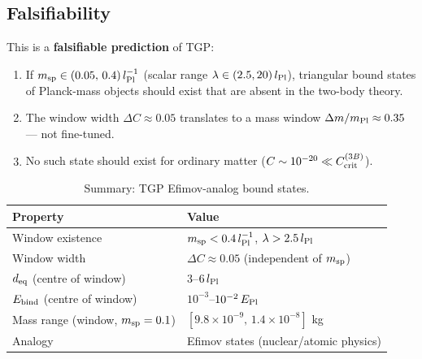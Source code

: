 \subsection{Falsifiability}

This is a \textbf{falsifiable prediction} of TGP:

\begin{enumerate}
\item If $m_{\rm sp}\in(0.05,\,0.4)\,l_{\rm Pl}^{-1}$ (scalar range
  $\lambda\in(2.5,20)\,l_{\rm Pl}$), triangular bound states of
  Planck-mass objects should exist that are absent in the two-body theory.
\item The window width $\Delta C\approx0.05$ translates to a mass window
  $\Delta m/m_{\rm Pl}\approx0.35$ — not fine-tuned.
\item No such state should exist for ordinary matter
  ($C\sim10^{-20}\ll C_{\rm crit}^{(3B)}$).
\end{enumerate}

\begin{table}[h]
\centering
\caption{Summary: TGP Efimov-analog bound states.}
\label{tab:efimov_summary}
\begin{tabular}{ll}
\hline
Property & Value \\
\hline
Window existence & $m_{\rm sp} < 0.4\,l_{\rm Pl}^{-1}$, $\lambda > 2.5\,l_{\rm Pl}$ \\
Window width & $\Delta C \approx 0.05$ (independent of $m_{\rm sp}$) \\
$d_{\rm eq}$ (centre of window) & $3$--$6\,l_{\rm Pl}$ \\
$E_{\rm bind}$ (centre of window) & $10^{-3}$--$10^{-2}\,E_{\rm Pl}$ \\
Mass range (window, $m_{\rm sp}=0.1$) & $[9.8\times10^{-9},\,1.4\times10^{-8}]$ kg \\
Analogy & Efimov states (nuclear/atomic physics) \\
\hline
\end{tabular}
\end{table}
